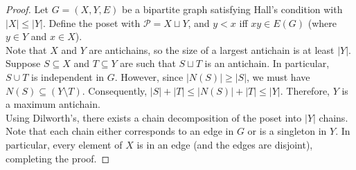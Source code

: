 			\begin{proof}
				Let $G=(X,Y,E)$ be a bipartite graph satisfying Hall's condition with $|X| \le |Y|$. Define the poset with $\mathcal{P} = X \sqcup Y$, and $y < x$ iff $xy \in E(G)$ (where $y \in Y$ and $x \in X$).\\
				Note that $X$ and $Y$ are antichains, so the size of a largest antichain is at least $|Y|$. Suppose $S \subseteq X$ and $T \subseteq Y$ are such that $S \sqcup T$ is an antichain. In particular, $S \cup T$ is independent in $G$. However, since $|N(S)| \ge |S|$, we must have $N(S) \subseteq (Y \setminus T)$. Consequently, $|S|+|T| \le |N(S)| + |T| \le |Y|$. Therefore, $Y$ is a maximum antichain.\\
				Using Dilworth's, there exists a chain decomposition of the poset into $|Y|$ chains. Note that each chain either corresponds to an edge in $G$ or is a singleton in $Y$. In particular, every element of $X$ is in an edge (and the edges are disjoint), completing the proof.
			\end{proof}